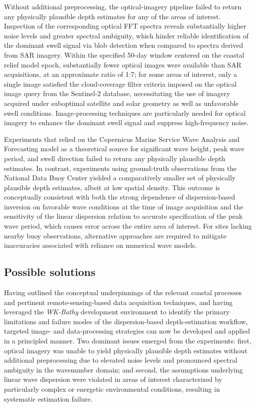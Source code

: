 \documentclass[12pt]{article}
\begin{document}
Without additional preprocessing, the optical-imagery pipeline failed to return any physically plausible depth estimates for any of the areas of interest. Inspection of the corresponding optical FFT spectra reveals substantially higher noise levels and greater spectral ambiguity, which hinder reliable identification of the dominant swell signal via blob detection when compared to spectra derived from SAR imagery. Within the specified 50-day window centered on the coastal relief model epoch, substantially fewer optical images were available than SAR acquisitions, at an approximate ratio of 1:7; for some areas of interest, only a single image satisfied the cloud-coverage filter criteria imposed on the optical image query from the Sentinel-2 database, necessitating the use of imagery acquired under suboptimal satellite and solar geometry as well as unfavorable swell conditions. Image-processing techniques are particularly needed for optical imagery to enhance the dominant swell signal and suppress high-frequency noise.

Experiments that relied on the Copernicus Marine Service Wave Analysis and Forecasting model as a theoretical source for significant wave height, peak wave period, and swell direction failed to return any physically plausible depth estimates. In contrast, experiments using ground-truth observations from the National Data Buoy Center yielded a comparatively smaller set of physically plausible depth estimates, albeit at low spatial density. This outcome is conceptually consistent with both the strong dependence of dispersion-based inversion on favorable wave conditions at the time of image acquisition and the sensitivity of the linear dispersion relation to accurate specification of the peak wave period, which causes error across the entire area of interest. For sites lacking nearby buoy observations, alternative approaches are required to mitigate inaccuracies associated with reliance on numerical wave models.

\subsection{Possible solutions}

Having outlined the conceptual underpinnings of the relevant coastal processes and pertinent remote-sensing-based data acquisition techniques, and having leveraged the \textit{WK-Bathy} development environment to identify the primary limitations and failure modes of the dispersion-based depth-estimation workflow, targeted image- and data-processing strategies can now be developed and applied in a principled manner. Two dominant issues emerged from the experiments: first, optical imagery was unable to yield physically plausible depth estimates without additional preprocessing due to elevated noise levels and pronounced spectral ambiguity in the wavenumber domain; and second, the assumptions underlying linear wave dispersion were violated in areas of interest characterized by particularly complex or energetic environmental conditions, resulting in systematic estimation failure.
\end{document}
